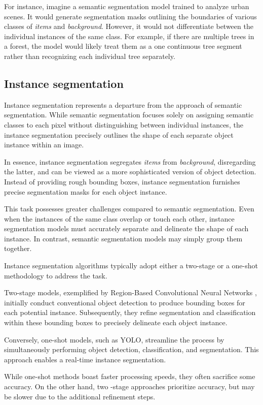 For instance, imagine a semantic segmentation model trained to analyze urban scenes. It would generate segmentation
masks outlining the boundaries of various classes of \textit{items} and \textit{background}. However, it would not
differentiate between the individual instances of the same class. For example, if there are multiple trees in a
forest, the model would likely treat them as a one continuous tree segment rather than recognizing each individual tree
separately.

\subsection{Instance segmentation}
Instance segmentation represents a departure from the approach of semantic segmentation. While semantic segmentation
focuses solely on assigning semantic classes to each pixel without distinguishing between individual instances,
the instance segmentation precisely outlines the shape of each separate object instance within an image.

In essence, instance segmentation segregates \textit{items} from \textit{background}, disregarding the latter, and can be viewed as a more sophisticated version of object detection. Instead of providing rough bounding boxes, instance segmentation furnishes precise segmentation masks for each object instance.

This task possesses greater challenges compared to semantic segmentation. Even when the instances of the same class
overlap
or touch each other, instance segmentation models must accurately separate and delineate the shape of each instance. In contrast, semantic segmentation models may simply group them together.

Instance segmentation algorithms typically adopt either a two-stage or a one-shot methodology to address the task.

Two-stage models, exemplified by Region-Based Convolutional Neural Networks \cite{RCNN2014}, initially conduct
conventional object detection to produce bounding boxes for each potential instance. Subsequently, they refine segmentation and classification within these bounding boxes to precisely delineate each object instance.

Conversely, one-shot models, such as YOLO, streamline the process by simultaneously performing object detection,
classification, and segmentation. This approach enables a real-time instance segmentation.

While one-shot methods boast faster processing speeds, they often sacrifice some accuracy. On the other hand, two
-stage approaches prioritize accuracy, but may be slower due to the additional refinement steps.

